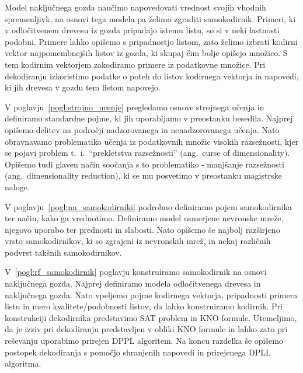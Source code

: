 \documentclass[12pt,a4paper,twoside]{article}
\theoremstyle{definition} %
\theoremstyle{plain} %
\numberwithin{equation}{section}  %
\begin{document}
Model naključnega gozda naučimo napovedovati vrednost svojih vhodnih spremenljivk, na osnovi tega modela pa želimo zgraditi samokodirnik.
Primeri, ki v odločitvenem drevesu iz gozda pripadajo istemu listu, so si v neki lastnosti podobni.
Primere lahko opišemo s pripadnostjo listom, zato želimo izbrati kodirni vektor najpomembnejših listov iz gozda, ki skupaj čim bolje opišejo množico.
S tem kodirnim vektorjem zakodiramo primere iz podatkovne množice.
Pri dekodiranju izkoristimo podatke o poteh do listov kodirnega vektorja in napovedi, ki jih drevesa v gozdu tem listom napovejo.


V poglavju~\ref{pogl:strojno_ucenje} pregledamo osnove strojnega učenja in definiramo standardne pojme, ki jih uporabljamo v preostanku besedila. 
Najprej opišemo delitev na področji nadzorovanega in nenadzorovanega učenja.
Nato obravnavamo problematiko učenja iz podatkovnih množic visokih razsežnosti, kjer se pojavi problem t.~i.~``prekletstva razsežnosti'' (ang.~curse of dimensionality). 
Opišemo tudi glaven način soočanja s to problematiko - manjšanje razsežnosti (ang.~dimensionality reduction), ki se mu posvetimo v preostanku magistrske naloge.

V poglavju~\ref{pogl:nn_samokodirniki} podrobno definiramo pojem samokodirnika ter način, kako ga vrednotimo.
Definiramo model usmerjene nevronske mreže, njegovo uporabo ter prednosti in slabosti.
Nato opišemo še najbolj razširjeno vrsto samokodirnikov, ki so zgrajeni iz nevronskih mrež, in nekaj različnih podvrst takšnih samokodirnikov.

V~\ref{pogl:rf_samokodirnik} poglavju konstruiramo samokodirnik na osnovi naključnega gozda.
Najprej definiramo modela odločitvenega drevesa in naključnega gozda.
Nato vpeljemo pojme kodirnega vektorja, pripadnosti primera listu in mero kvalitete/\-podobnosti listov, da lahko konstruiramo kodirnik.
Pri konstrukciji dekodirnika predstavimo SAT problem in KNO formule. 
Utemeljimo, da je izziv pri dekodiranju predstavljen v obliki KNO formule in lahko zato pri reševanju uporabimo prirejen DPPL algoritem.
Na koncu razdelka še opišemo postopek dekodiranja s pomočjo shranjenih napovedi in prirejenega DPLL algoritma.
\end{document}
